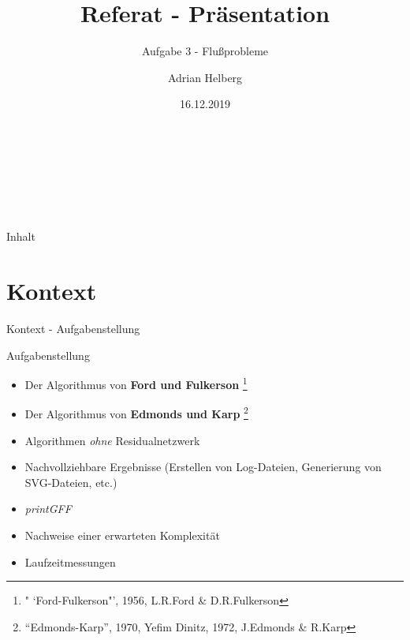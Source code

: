 \documentclass{beamer}
\author{Adrian Helberg}
\title{Referat - Pr\"asentation}
\subtitle{Aufgabe 3 - Flu\ss{}probleme}
\date{16.12.2019}
\begin{document}
    \begin{frame}[plain]
        \maketitle
        \small
        \\~\\~\\~\\
    \end{frame}

    \begin{frame}{Inhalt}
        \tableofcontents
    \end{frame}

    \section{Kontext}
    \begin{frame}{Kontext - Aufgabenstellung}
        \begin{block}{Aufgabenstellung}
            \begin{itemize}
                \item Der Algorithmus von \textbf{Ford und Fulkerson} \footnote{" `Ford-Fulkerson"', 1956, L.R.Ford \& D.R.Fulkerson}
                \item Der Algorithmus von \textbf{Edmonds und Karp} \footnote{"`Edmonds-Karp"', 1970, Yefim Dinitz, 1972, J.Edmonds \& R.Karp}
                \item Algorithmen \textit{ohne} Residualnetzwerk
                \item Nachvollziehbare Ergebnisse (Erstellen von Log-Dateien, Generierung von SVG-Dateien, etc.)
                \item \textit{printGFF}
                \item Nachweise einer erwarteten Komplexit\"at
                \item Laufzeitmessungen
            \end{itemize}
        \end{block}
    \end{frame}
\end{document}
